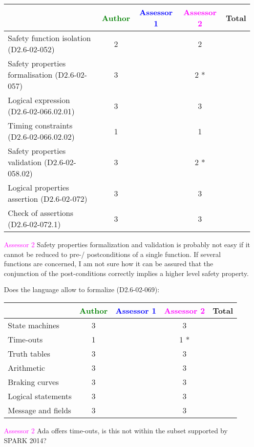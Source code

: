 \begin{tabular}{|l | c | c | c | c|}
\hline
& \textcolor{green}{Author} & \textcolor{blue}{Assessor 1} & \textcolor{magenta}{Assessor 2} & Total \\
\hline 
Safety function isolation (D2.6-02-052)  & 2    & & 2    &  \\
\hline 
Safety properties formalisation (D2.6-02-057)  & 3    & & 2   * &  \\
\hline
Logical expression (D2.6-02-066.02.01)  & 3    & & 3    &  \\
\hline
Timing constraints (D2.6-02-066.02.02)  & 1    & & 1    &  \\
\hline
Safety properties validation (D2.6-02-058.02)  & 3    & & 2   * &  \\
\hline
Logical properties assertion (D2.6-02-072)  & 3    & & 3    &  \\
\hline
Check  of assertions (D2.6-02-072.1)  & 3    & & 3    &  \\
\hline
\end{tabular}

\textcolor{magenta}{Assessor 2} Safety properties formalization and validation
is probably not easy if it cannot be reduced to pre-/ postconditions of a single
function. If several functions are concerned, I am not sure how it can be
assured that the conjunction of the post-conditions correctly implies a higher
level safety property.

Does the language allow to  formalize (D2.6-02-069):

\begin{tabular}{|l | c | c | c | c|}
\hline
& \textcolor{green}{Author} & \textcolor{blue}{Assessor 1} & \textcolor{magenta}{Assessor 2} & Total \\
\hline 
State machines  & 3    & & 3    &  \\
\hline
Time-outs  & 1    & & 1   * &  \\
\hline
Truth tables  & 3    & & 3    &  \\
\hline
Arithmetic  & 3    & & 3    &  \\
\hline
Braking curves  & 3    & & 3    &  \\
\hline
Logical statements & 3    & & 3    &  \\
\hline
Message and fields & 3    & & 3    &  \\
\hline
\end{tabular}

\textcolor{magenta}{Assessor 2} Ada offers time-outs, is this not within the
subset supported by SPARK 2014?

